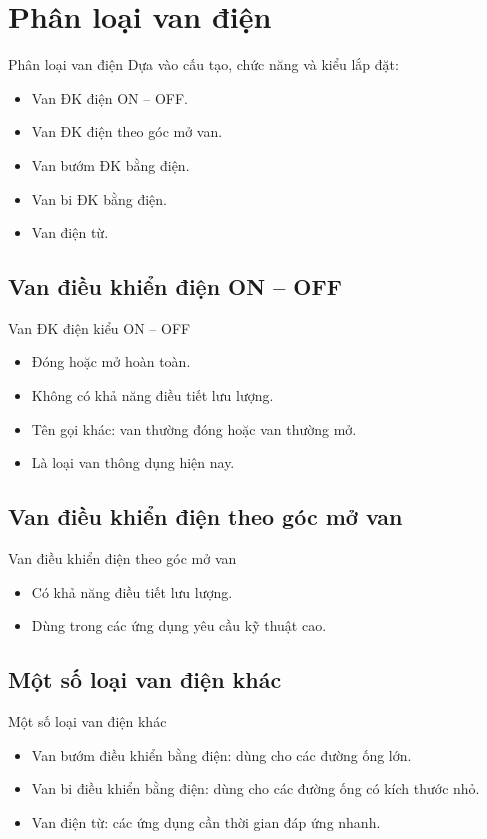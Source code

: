\documentclass[20pt]{beamer}
\begin{document}
\section{Phân loại van điện}
\begin{frame}{Phân loại van điện}
\alert{Dựa vào cấu tạo, chức năng và kiểu lắp đặt:}
\begin{itemize}
\justifying
	\item Van ĐK điện ON -- OFF.
	\item Van ĐK điện theo góc mở van.
	\item Van bướm ĐK bằng điện.
	\item Van bi ĐK bằng điện.
	\item Van điện từ.
\end{itemize}
\end{frame}

\subsection*{Van điều khiển điện ON -- OFF}
\begin{frame}{Van ĐK điện kiểu ON -- OFF}
\begin{itemize}
\justifying
\item Đóng hoặc mở hoàn toàn.
\item Không có khả năng điều tiết lưu lượng.
\item Tên gọi khác: van thường đóng hoặc van thường mở.
\item Là loại van thông dụng hiện nay.
\end{itemize}
\end{frame}
\subsection*{Van điều khiển điện theo góc mở van}
\begin{frame}{Van điều khiển điện theo góc mở van}
\begin{itemize}
\justifying
	\item Có khả năng điều tiết lưu lượng.
	\item Dùng trong các ứng dụng yêu cầu kỹ thuật cao.
\end{itemize}
\end{frame}

\subsection*{Một số loại van điện khác}
\begin{frame}{Một số loại van điện khác}
\begin{itemize}
\justifying
	\item \alert{Van bướm điều khiển bằng điện:} dùng cho các đường ống lớn.
	\item \alert{Van bi điều khiển bằng điện:} dùng cho các đường ống có kích thước nhỏ.
	\item \alert{Van điện từ:} các ứng dụng cần thời gian đáp ứng nhanh.	
\end{itemize}
\end{frame}
\end{document}
